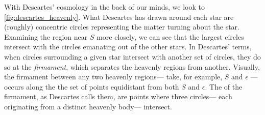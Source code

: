 \documentclass[12pt,twoside]{reedthesis}
\begin{document}
   With Descartes' cosmology in the back of our minds, we look to \cref{fig:descartes_heavenly}. What Descartes has drawn around each star are (roughly) concentric circles representing the matter turning about the star. Examining the region near $S$ more closely, we can see that the largest circles intersect with the circles emanating out of the other stars. In Descartes' terms, when circles surrounding a given star intersect with another set of circles, they do so at the \emph{firmament}, which separates the heavenly regions from another. Visually, the firmament between any two heavenly regions--- take, for example, $S$ and $\epsilon$ --- occurs along the the set of points equidistant from both $S$ and $\epsilon$. The  of the firmament, as Descartes calls them, are points where three circles--- each originating from a distinct heavenly body--- intersect. 

\end{document}
